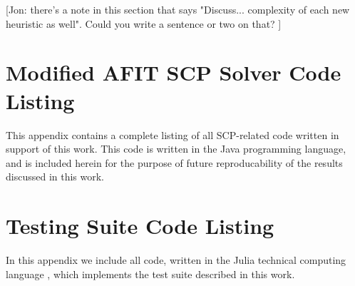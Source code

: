 \documentclass[12pt]{article}
\begin{document}
	[Jon: there's a note in this section that says "Discuss... complexity of each new heuristic as well". Could you write a sentence or two on that? ]
	
	\pagebreak
	\appendix		%
	
	\section{Modified AFIT SCP Solver Code Listing}
	
	This appendix contains a complete listing of all SCP-related code written in support of this work. This code is written in the Java programming language, and is included herein for the purpose of future reproducability of the results discussed in this work.
	
	
	
	
	
	
	\section{Testing Suite Code Listing}
	In this appendix we include all code, written in the Julia technical computing language \cite{Julia}, which implements the test suite described in this work. 
	
	
	
	
	
\end{document}
